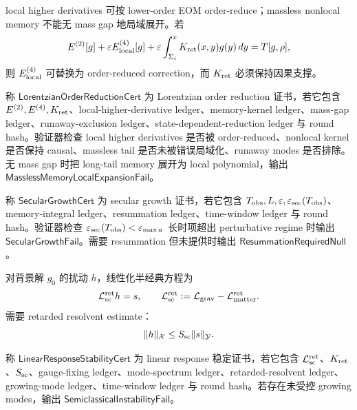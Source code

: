 local higher derivatives 可按 lower-order EOM order-reduce；massless nonlocal memory 不能无 mass gap 地局域展开。若
\[
E^{(2)}[g]+\varepsilon E_{\rm local}^{(4)}[g]
+\varepsilon\int_{\Sigma_i}^{x}K_{\rm ret}(x,y)g(y)\,dy
=T[g,\rho],
\]
则 \(E_{\rm local}^{(4)}\) 可替换为 order-reduced correction，而 \(K_{\rm ret}\) 必须保持因果支撑。

\begin{definition}\label{def:typed-address-biaxial-completion-lorentzian-order-reduction-cert}
称 \(\mathsf{LorentzianOrderReductionCert}\) 为 Lorentzian order reduction 证书，若它包含 \(E^{(2)},E^{(4)},K_{\rm ret}\)、local-higher-derivative ledger、memory-kernel ledger、mass-gap ledger、runaway-exclusion ledger、state-dependent-reduction ledger 与 round hash。验证器检查 local higher derivatives 是否被 order-reduced、nonlocal kernel 是否保持 causal、massless tail 是否未被错误局域化、runaway modes 是否排除。无 mass gap 时把 long-tail memory 展开为 local polynomial，输出 \(\mathsf{MasslessMemoryLocalExpansionFail}\)。
\end{definition}

\begin{definition}\label{def:typed-address-biaxial-completion-secular-growth-cert}
称 \(\mathsf{SecularGrowthCert}\) 为 secular growth 证书，若它包含 \(T_{\rm obs},L,\varepsilon,\varepsilon_{\rm sec}(T_{\rm obs})\)、memory-integral ledger、resummation ledger、time-window ledger 与 round hash。验证器检查 \(\varepsilon_{\rm sec}(T_{\rm obs})<\varepsilon_{\max}\)。长时项超出 perturbative regime 时输出 \(\mathsf{SecularGrowthFail}\)。需要 resummation 但未提供时输出 \(\mathsf{ResummationRequiredNull}\)。
\end{definition}

对背景解 \(g_0\) 的扰动 \(h\)，线性化半经典方程为
\[
\mathcal L_{\rm sc}^{\rm ret}h=s,
\qquad
\mathcal L_{\rm sc}^{\rm ret}
:=
\mathcal L_{\rm grav}-\mathcal L_{\rm matter}^{\rm ret}.
\]
需要 retarded resolvent estimate：
\[
\|h\|_{\mathcal X}
\le
S_{\rm sc}\|s\|_{\mathcal Y}.
\]

\begin{definition}\label{def:typed-address-biaxial-completion-linear-response-stability-cert}
称 \(\mathsf{LinearResponseStabilityCert}\) 为 linear response 稳定证书，若它包含 \(\mathcal L_{\rm sc}^{\rm ret}\)、\(K_{\rm ret}\)、\(S_{\rm sc}\)、gauge-fixing ledger、mode-spectrum ledger、retarded-resolvent ledger、growing-mode ledger、time-window ledger 与 round hash。若存在未受控 growing modes，输出 \(\mathsf{SemiclassicalInstabilityFail}\)。
\end{definition}

